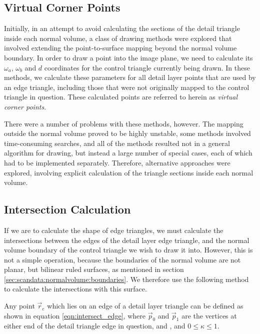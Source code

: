 \subsection{\label{sec:dispmapcreation:edges:virtual}Virtual Corner Points}

Initially, in an attempt to avoid calculating the sections of the detail triangle inside each normal volume, a class of drawing methods were explored that involved extending the point-to-surface mapping beyond the normal volume boundary. In order to draw a point into the image plane, we need to calculate its $\omega_a$, $\omega_b$ and $d$ coordinates for the control triangle currently being drawn. In these methods, we calculate these parameters for all detail layer points that are used by an edge triangle, including those that were not originally mapped to the control triangle in question. These calculated points are referred to herein as {\it virtual corner points}.

There were a number of problems with these methods, however. The mapping outside the normal volume proved to be highly unstable, some methods involved time-consuming searches, and all of the methods resulted not in a general algorithm for drawing, but instead a large number of special cases, each of which had to be implemented separately. Therefore, alternative approaches were explored, involving explicit calculation of the triangle sections inside each normal volume. 


\subsection{\label{sec:dispmapcreation:edges:intersection}Intersection Calculation}

If we are to calculate the shape of edge triangles, we must calculate the intersections between the edges of the detail layer edge triangle, and the normal volume boundary of the control triangle we wish to draw it into. However, this is not a simple operation, because the boundaries of the normal volume are not planar, but bilinear ruled surfaces, as mentioned in section \ref{sec:scandata:normalvolume:boundaries}. We therefore use the following method to calculate the intersections with this surface.

Any point $\vec{r}_e$ which lies on an edge of a detail layer triangle can be defined as shown in equation \ref{eqn:intersect_edge}, where $\vec{p}_0$ and $\vec{p}_1$ are the vertices at either end of the detail triangle edge in question, and , and $0 \leq \kappa \leq 1$.

